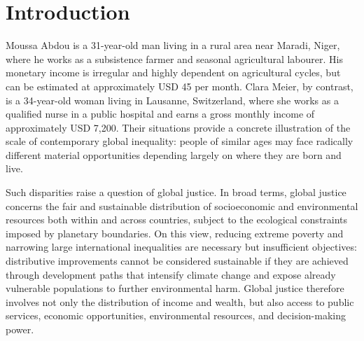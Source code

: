 \documentclass[11pt,a4paper]{article}
\begin{document}
\newpage
\setcounter{page}{1}
\section*{Introduction}

Moussa Abdou is a 31-year-old man living in a rural area near Maradi, Niger, where he works as a subsistence farmer and seasonal agricultural labourer. His monetary income is irregular and highly dependent on agricultural cycles, but can be estimated at approximately USD 45 per month. Clara Meier, by contrast, is a 34-year-old woman living in Lausanne, Switzerland, where she works as a qualified nurse in a public hospital and earns a gross monthly income of approximately USD 7,200. Their situations provide a concrete illustration of the scale of contemporary global inequality: people of similar ages may face radically different material opportunities depending largely on where they are born and live.

Such disparities raise a question of global justice. In broad terms, global justice concerns the fair and sustainable distribution of socioeconomic and environmental resources both within and across countries, subject to the ecological constraints imposed by planetary boundaries. On this view, reducing extreme poverty and narrowing large international inequalities are necessary but insufficient objectives: distributive improvements cannot be considered sustainable if they are achieved through development paths that intensify climate change and expose already vulnerable populations to further environmental harm. Global justice therefore involves not only the distribution of income and wealth, but also access to public services, economic opportunities, environmental resources, and decision-making power.
\end{document}
